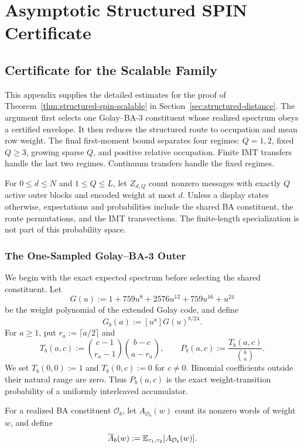 \section{Asymptotic Structured SPIN Certificate}

\subsection{Certificate for the Scalable Family}
\label{app:structured-scalable-certificate}

This appendix supplies the detailed estimates for the proof of
Theorem~\ref{thm:structured-spin-scalable} in
Section~\ref{sec:structured-distance}. The argument
first selects one Golay--BA-3 constituent whose realized spectrum obeys a
certified envelope. It then reduces the structured route to occupation and
mean row weight. The final first-moment bound separates four regimes:
$Q=1,2$, fixed $Q\ge3$, growing sparse $Q$, and positive relative
occupation. Finite IMT transfers handle the last two regimes. Continuum
transfers handle the fixed regimes.

For $0\le d\le N$ and $1\le Q\le L$, let $Z_{d,Q}$ count nonzero messages
with exactly $Q$ active outer blocks and encoded weight at most $d$. Unless a
display states otherwise, expectations and probabilities include the shared
BA constituent, the route permutations, and the IMT transvections. The
finite-length specialization is not part of this probability space.

\subsubsection{The One-Sampled Golay--BA-3 Outer}

We begin with the exact expected spectrum before selecting the shared
constituent. Let
\[
  G(u):=1+759u^8+2576u^{12}+759u^{16}+u^{24}
\]
be the weight polynomial of the extended Golay code, and define
\[
  G_b(a):=[u^a]G(u)^{b/24}.
\]
For $a\ge1$, put $r_a:=\lceil a/2\rceil$ and
\begin{equation}
  T_b(a,c)
  :=
  \binom{c-1}{r_a-1}\binom{b-c}{a-r_a},
  \qquad
  P_b(a,c):=\frac{T_b(a,c)}{\binom ba}.
  \label{eq:structured-acc-transition}
\end{equation}
We set $T_b(0,0):=1$ and $T_b(0,c):=0$ for $c\ne0$. Binomial coefficients
outside their natural range are zero. Thus $P_b(a,c)$ is the exact
weight-transition probability of a uniformly interleaved accumulator.

For a realized BA constituent $\mathcal O_b$, let
$A_{\mathcal O_b}(w)$ count its nonzero words of weight $w$, and define
\[
  \overline A_b(w)
  :=
  \mathbb E_{\tau_1,\tau_2}[A_{\mathcal O_b}(w)].
\]

